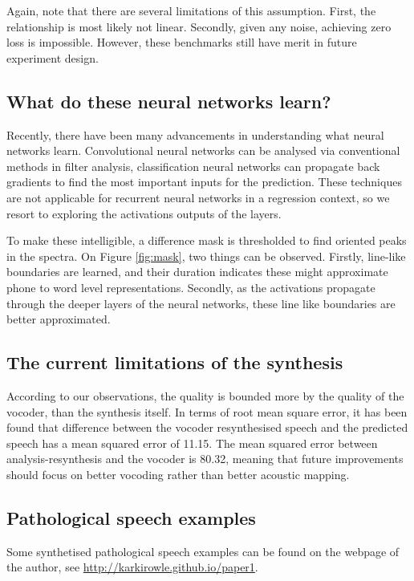 \documentclass[a4paper]{article}
\begin{document}
Again, note that there are several limitations of this assumption. First, the
relationship is most likely not linear. Secondly, given any noise, achieving
zero loss is impossible. However, these benchmarks still have merit in
future experiment design.


\subsection{What do these neural networks learn?} \label{section:visualisation}


Recently, there have been many advancements in understanding what neural networks learn.
Convolutional neural networks can be analysed via conventional methods in filter analysis,
classification neural networks can propagate back gradients to find the most important inputs for
the prediction. These techniques are not applicable for recurrent neural networks in a regression
context, so we resort to exploring the activations outputs of the layers.

To make these intelligible, a difference mask is thresholded to find oriented peaks in the spectra.
On Figure \ref{fig:mask}, two things can be observed. Firstly, line-like boundaries are learned, and their duration indicates these might approximate phone to word level representations. Secondly, as the activations propagate through the deeper layers of the neural networks, these line like boundaries are better approximated.

\subsection{The current limitations of the synthesis} \label{section:limitations}
According to our observations, the quality is bounded more by the
quality of the vocoder, than the synthesis itself. In terms of root mean square
error, it has been found that difference between the vocoder resynthesised speech
and the predicted speech has a mean squared error of 11.15. The mean squared error
between analysis-resynthesis and the vocoder is 80.32, meaning that
future improvements should focus on better vocoding rather than better
acoustic mapping.


\subsection{Pathological speech examples}

Some synthetised pathological speech examples can be found on the webpage of the
author, see \url{http://karkirowle.github.io/paper1}.  
\end{document}
